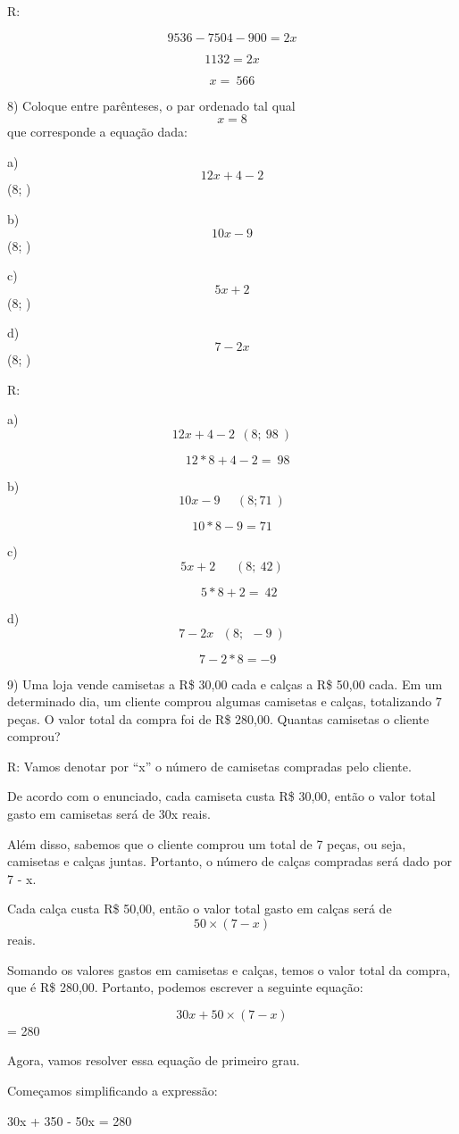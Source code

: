 R:

\[9536 - 7504 - 900 = 2x\]

\[1132 = 2x\]

\[x = \ 566\]

8) Coloque entre parênteses, o par ordenado tal qual \[x = 8\] que
corresponde a equação dada:

a) \[12x + 4 - 2\] (8; )

b) \[10x - 9\] (8; )

c) \[5x + 2\] (8; )

d) \[7 - 2x\] (8; )

R:

a) \[12x + 4 - 2\ \ (8;\ 98\ )\]

\[\ \ \ \ 12*8 + 4 - 2 = \ 98\]

b) \[10x - 9\ \ \ \ \ \ (8;71\ )\]

\[10*8 - 9 = 71\]

c) \[5x + 2\ \ \ \ \ \ \ (8;\ 42)\]

\[\ \ \ \ \ 5*8 + 2 = \ 42\]

d) \[7 - 2x\text{\ \ \ \ \ \ \ \ }\left( 8;\ \  - 9\  \right)\]

\[\ \ \ \ 7 - 2*8 = - 9\]

9) Uma loja vende camisetas a R\$ 30,00 cada e calças a R\$ 50,00 cada.
Em um determinado dia, um cliente comprou algumas camisetas e calças,
totalizando 7 peças. O valor total da compra foi de R\$ 280,00. Quantas
camisetas o cliente comprou?

R: Vamos denotar por ``x'' o número de camisetas compradas pelo cliente.

De acordo com o enunciado, cada camiseta custa R\$ 30,00, então o valor
total gasto em camisetas será de 30x reais.

Além disso, sabemos que o cliente comprou um total de 7 peças, ou seja,
camisetas e calças juntas. Portanto, o número de calças compradas será
dado por 7 - x.

Cada calça custa R\$ 50,00, então o valor total gasto em calças será de
\[50 \times (7 - x)\] reais.

Somando os valores gastos em camisetas e calças, temos o valor total da
compra, que é R\$ 280,00. Portanto, podemos escrever a seguinte equação:

\[30x + 50 \times (7-x)\] = 280

Agora, vamos resolver essa equação de primeiro grau.

Começamos simplificando a expressão:

30x + 350 - 50x = 280

